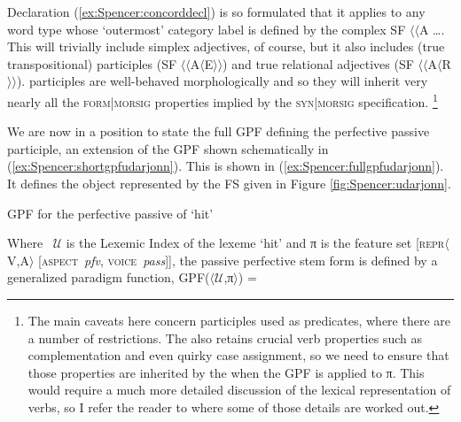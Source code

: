 \documentclass[output=paper]{langsci/langscibook}
\begin{document}
\noindent Declaration (\ref{ex:Spencer:concorddecl}) is so formulated that it applies to any word type whose `outermost' category label is defined by the complex SF $\langle\langle$A \ldots{}. This will trivially include simplex adjectives, of course, but it also includes (true transpositional) participles (SF $\langle\langle$A$\langle$E$\rangle\rangle$) and true relational adjectives (SF $\langle\langle$A$\langle$R$\rangle\rangle$).  participles are well-behaved morphologically and so they will inherit very nearly all the \textsc{form}|\textsc{morsig} properties implied by the \textsc{syn}|\textsc{morsig} specification.%
\footnote{The main caveats here concern participles used as predicates, where there are a number of restrictions. The  also retains crucial verb properties such as complementation and even quirky case assignment, so we need to ensure that those properties are inherited by the  when the GPF is applied to π. This would require a much more detailed discussion of the lexical representation of verbs, so I refer the reader to %
\citet{Spencer17:Russptcps} %
%
where some of those details are worked out.} %


 We are now in a position to state the full GPF defining the perfective passive participle, an extension of the GPF shown schematically in (\ref{ex:Spencer:shortgpfudarjonn}). This is shown in (\ref{ex:Spencer:fullgpfudarjonn}). It defines the object represented by the FS given in Figure \ref{fig:Spencer:udarjonn}.

 \renewcommand{\theenumi}{\roman{enumi}}
  \renewcommand{\labelenumi}{(\roman{enumi})}

 \ea

 \label{ex:Spencer:fullgpfudarjonn} GPF for the perfective passive  of   `hit'

Where{\ }  $\mathcal{U}$ is the Lexemic Index of the lexeme   `hit' and π is the feature set [\textsc{repr}$\langle$V,A$\rangle$  [\textsc{aspect}~\textit{pfv}, \textsc{voice}~\textit{pass}]], the  passive perfective  stem form is defined by a generalized paradigm function, GPF($\langle$$\mathcal{U}$,π$\rangle$) = \medskip
\end{document}

